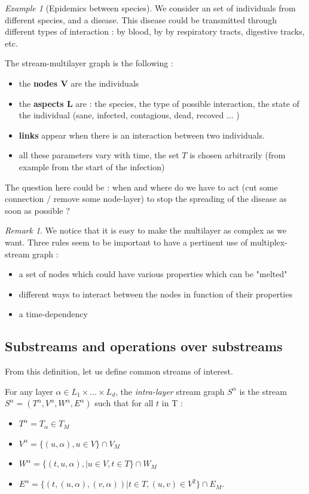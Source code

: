 \documentclass[dvipsnames,a4paper,11pt]{article}
\theoremstyle{definition}
\theoremstyle{remark}
\newtheorem{rmq}{Remark}
\theoremstyle{remark}
\newtheorem{ex}{Example}
\begin{document}
	\begin{ex}[Epidemics between species]
		We consider an set of individuals from different species, and a disease. This disease could be transmitted through different types of interaction : by blood, by  by respiratory tracts, digestive tracks, etc.
		
		The stream-multilayer graph is the following : 
		\begin{itemize}
			\item the {\bf nodes V} are the individuals
			\item the {\bf aspects L} are : the species, the type of possible interaction, the state of the individual (sane, infected, contagious, dead, recoved ... ) 
			\item {\bf links} appear when there is an interaction between two individuals.
			\item all these parameters vary with time, the set $T$ is chosen arbitrarily (from example from the start of the infection)
		\end{itemize}
	
		The question here could be : when and where do we have to act (cut some connection / remove some node-layer) to stop the spreading of the disease as soon as possible ?
	\end{ex}

	
	\begin{rmq}
		We notice that it is easy to make the multilayer as complex as we want. Three rules seem to be important to have a pertinent use of multiplex-stream graph :
		\begin{itemize}
			\item a set of nodes which could have various properties which can be "melted"
			\item different ways to interact between the nodes in function of their properties
			\item a time-dependency
		\end{itemize}
	\end{rmq}
	
	
   	\subsection{Substreams and operations over substreams}

    From this definition, let us define common streams of interest.

	For any layer $\alpha \in L_1 \times \dots \times L_d$, the {\em intra-layer} stream graph $S^{\alpha}$ is the stream $S^{\alpha}=(T^{\alpha},V^{\alpha},W^{\alpha},E^{\alpha})$ such that for all $t$ in T :
	\begin{itemize}
		\item $T^{\alpha} = T_{\alpha} \in T_M$
		\item $V^{\alpha} =\{(u,\alpha),u\in V\} \cap V_M$
		\item $W^{\alpha} =\{(t,u,\alpha),|u\in V, t \in T \} \cap W_M$
		\item $E^{\alpha} = \{(t,(u,\alpha),(v,\alpha))| t \in T,(u,v)\in V^2 \} \cap E_M$.
	\end{itemize}
\end{document}
